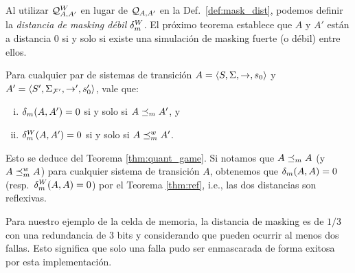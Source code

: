 Al utilizar $\mathcal{Q}^W_{A,A'}$ en lugar de $\mathcal{Q}_{A, A'}$ en la 
Def.~\ref{def:mask_dist}, podemos definir la \emph{distancia de masking débil} $\delta_{m}^W$. El próximo teorema establece que $A$ y
$A'$ están a distancia $0$ si y solo si existe una simulación de masking fuerte (o débil) entre ellos.

\begin{theorem}\label{thm:ref}
  Para cualquier par de sistemas de transición $A = \langle S, \Sigma, \rightarrow, s_0 \rangle$ y $A' = \langle S', \Sigma_{\mathcal{F'}}, \rightarrow', s'_0 \rangle$, vale que:
  \begin{enumerate}[(i)]
  \item  $\delta_{m}(A,A') = 0$ si y solo si $A \preceq_{m} A'$, y
   \item $\delta_{m}^W(A,A') = 0$ si y solo si $A \preceq^w_{m} A' $.
  \end{enumerate}
\end{theorem}
%
Esto se deduce del Teorema \ref{thm:quant_game}.
Si notamos que $A \preceq_{m} A$ (y $A \preceq^w_{m} A$) para cualquier sistema de transición $A$, obtenemos que $\delta_{m}(A,A)=0$ (resp.\ $\delta_{m}^W(A,A)=0$) por el Teorema \ref{thm:ref}, i.e., 
las dos distancias son reflexivas.

Para nuestro ejemplo de la celda de memoria, la distancia de masking es de $1/3$ 
con una redundancia de $3$ bits y considerando que pueden ocurrir al menos dos fallas. 
Esto significa que solo una falla pudo ser enmascarada de forma exitosa por esta implementación. \\


